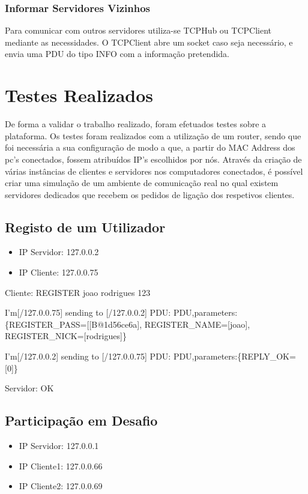 \documentclass[runningheads,a4paper]{llncs}
\begin{document}
\subsubsection{Informar Servidores Vizinhos}

Para comunicar com outros servidores utiliza-se TCPHub ou TCPClient mediante as necessidades.
O TCPClient abre um socket caso seja necessário, e envia uma PDU do tipo INFO com a informação pretendida.

\section{Testes Realizados}

De forma a validar o trabalho realizado, foram efetuados testes sobre a plataforma. Os testes foram realizados com a utilização de um router, sendo que foi necessária a sua configuração de modo a que, a partir do MAC Address dos pc’s conectados, fossem atribuídos IP’s escolhidos por nós. Através da criação de várias instâncias de clientes e servidores nos computadores conectados, é possível criar uma simulação de um ambiente de comunicação real no qual existem servidores dedicados que recebem os pedidos de ligação dos respetivos clientes.

\subsection{Registo de um Utilizador}

\begin{itemize}

\item IP Servidor: 127.0.0.2
\item IP Cliente: 127.0.0.75

\end{itemize}
Cliente: REGISTER joao rodrigues 123

I'm[/127.0.0.75] sending to [/127.0.0.2] PDU: PDU,parameters:\{REGISTER\_PASS=[[B@1d56ce6a], REGISTER\_NAME=[joao], REGISTER\_NICK=[rodrigues]\}

I'm[/127.0.0.2] sending to [/127.0.0.75] PDU: PDU,parameters:\{REPLY\_OK=[0]\}

Servidor: OK

\subsection{Participação em Desafio}

\begin{itemize}

\item IP Servidor: 127.0.0.1
\item IP Cliente1: 127.0.0.66
\item IP Cliente2: 127.0.0.69

\end{itemize}
\end{document}
